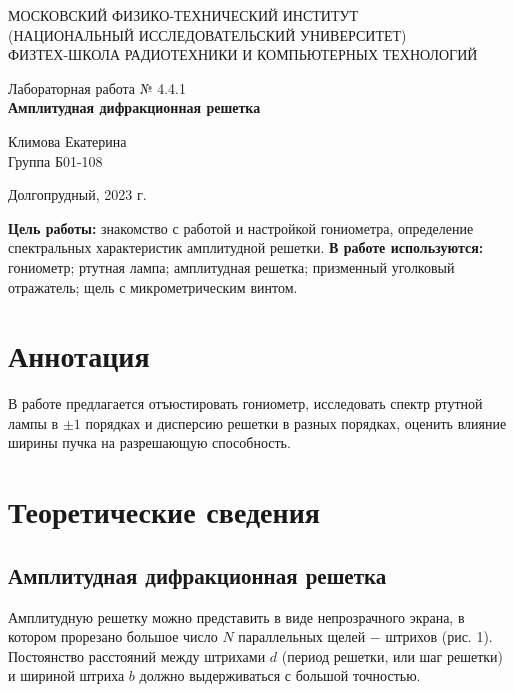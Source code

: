 \documentclass[a4paper,12pt]{article} %
\begin{document}
\begin{center}
	\footnotesize{МОСКОВСКИЙ ФИЗИКО-ТЕХНИЧЕСКИЙ ИНСТИТУТ\\(НАЦИОНАЛЬНЫЙ 			ИССЛЕДОВАТЕЛЬСКИЙ УНИВЕРСИТЕТ)}\\
	\footnotesize{ФИЗТЕХ-ШКОЛА РАДИОТЕХНИКИ И КОМПЬЮТЕРНЫХ ТЕХНОЛОГИЙ\\}
	\hfill \break
	\hfill \break
	\hfill \break
	\hfill \break
	\hfill \break
	\hfill \break
\end{center}

\begin{center}   
    \hfill \break
	\hfill \break
	\hfill \break
	\hfill \break
	\hfill \break
	\hfill \break
	\hfill \break
	\hfill \break
	\hfill \break
	\hfill \break
	\hfill \break
	\large{Лабораторная работа № 4.4.1\\\large{\textbf{Амплитудная дифракционная решетка}}}\\
	\hfill \break
	\hfill \break
	\hfill \break
	\hfill \break
	\hfill \break
	\hfill \break
	\hfill \break
	\hfill \break
	\hfill \break
	\hfill \break
	\hfill \break
	\begin{flushright}
		Климова Екатерина\\
		Группа Б01-108
	\end{flushright}
	\hfill \break
\end{center}
\hfill \break
\hfill \break
\begin{center}
	Долгопрудный, 2023 г.
\end{center}
\thispagestyle{empty}

\newpage
\hfill \break
\textbf{Цель работы:} знакомство с работой и настройкой гониометра, определение спектральных характеристик амплитудной решетки.
\hfill \break
\hfill \break
\textbf{В работе используются:} гониометр; ртутная лампа; амплитудная решетка; призменный уголковый отражатель; щель с микрометрическим винтом.

\section{Аннотация}
\hfill \break В работе предлагается отъюстировать гониометр, исследовать спектр ртутной лампы в $\pm 1$ порядках и дисперсию решетки в разных порядках, оценить влияние ширины пучка на разрешающую способность.

\section{Теоретические сведения}
\subsection{Амплитудная дифракционная решетка}
\hfill \break Амплитудную решетку можно представить в виде непрозрачного экрана, в котором прорезано большое число $N$ параллельных щелей $-$ штрихов (рис. 1). Постоянство расстояний между штрихами $d$ (период решетки, или шаг решетки) и шириной штриха $b$ должно выдерживаться с большой точностью.
\end{document}
